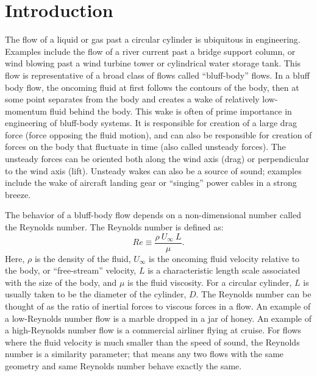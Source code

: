 \documentclass{article}
\begin{document}
\section*{Introduction}
The flow of a liquid or gas past a circular cylinder is ubiquitous in
engineering.  Examples include the flow of a river current past a
bridge support column, or wind blowing past a wind turbine tower or
cylindrical water storage tank.  This flow is representative of a
broad class of flows called ``bluff-body'' flows. In a bluff body
flow, the oncoming fluid at first follows the contours of the body,
then at some point separates from the body and creates a wake of
relatively low-momentum fluid behind the body.  This wake is often of
prime importance in engineering of bluff-body systems.  It is
responsible for creation of a large drag force (force opposing the
fluid motion), and can also be responsible for creation of forces on
the body that fluctuate in time (also called unsteady forces).  The
unsteady forces can be oriented both along the wind axis (drag) or
perpendicular to the wind axis (lift).  Unsteady wakes can also be a
source of sound; examples include the wake of aircraft landing gear or
``singing'' power cables in a strong breeze.

The behavior of a bluff-body flow depends on a non-dimensional number
called the Reynolds number.  The Reynolds number is defined as:
\begin{equation}
Re \equiv \frac{\rho~U_\infty~L}{\mu}.
\end{equation}
Here, $\rho$ is the density of the fluid, $U_\infty$ is the oncoming 
fluid velocity relative to the body, or ``free-stream'' velocity, $L$
is a characteristic length scale associated with the size of the body,
and $\mu$ is the fluid viscosity.  For a circular cylinder, $L$ is
usually taken to be the diameter of the cylinder, $D$.  The Reynolds number
can be thought of as the ratio of inertial forces to viscous forces in
a flow.  An example of a low-Reynolds number flow is a marble
dropped in a jar of honey.  An example of a high-Reynolds number flow
is a commercial airliner flying at cruise.  For flows where the
fluid velocity is much smaller than the speed of sound, the Reynolds
number is a similarity parameter; that means any two flows with the
same geometry and same Reynolds number behave exactly the same.
\end{document}
